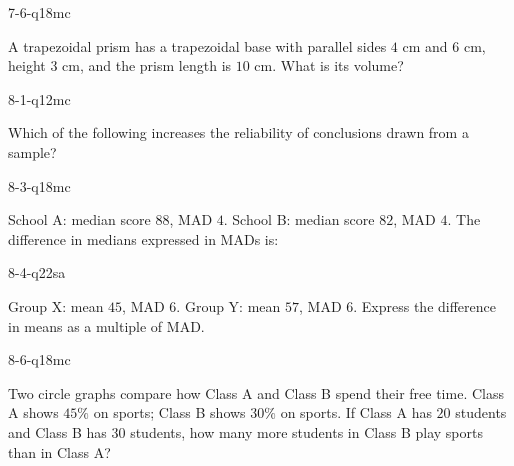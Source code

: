\begin{practiceQuestion}{7-6-q18}{mc}
\begin{questionText}
A trapezoidal prism has a trapezoidal base with parallel sides $4$ cm and $6$ cm, height $3$ cm, and the prism length is $10$ cm. What is its volume?
\end{questionText}
\end{practiceQuestion}

\begin{practiceQuestion}{8-1-q12}{mc}
\begin{questionText}
Which of the following increases the reliability of conclusions drawn from a sample?
\end{questionText}
\end{practiceQuestion}

\begin{practiceQuestion}{8-3-q18}{mc}
\begin{questionText}
School A: median score $88$, MAD $4$. School B: median score $82$, MAD $4$. The difference in medians expressed in MADs is:
\end{questionText}
\end{practiceQuestion}

\begin{practiceQuestion}{8-4-q22}{sa}
\begin{questionText}
Group X: mean $45$, MAD $6$. Group Y: mean $57$, MAD $6$. Express the difference in means as a multiple of MAD.
\end{questionText}
\end{practiceQuestion}

\begin{practiceQuestion}{8-6-q18}{mc}
\begin{questionText}
Two circle graphs compare how Class A and Class B spend their free time. Class A shows $45\%$ on sports; Class B shows $30\%$ on sports. If Class A has $20$ students and Class B has $30$ students, how many more students in Class B play sports than in Class A?
\end{questionText}
\end{practiceQuestion}

